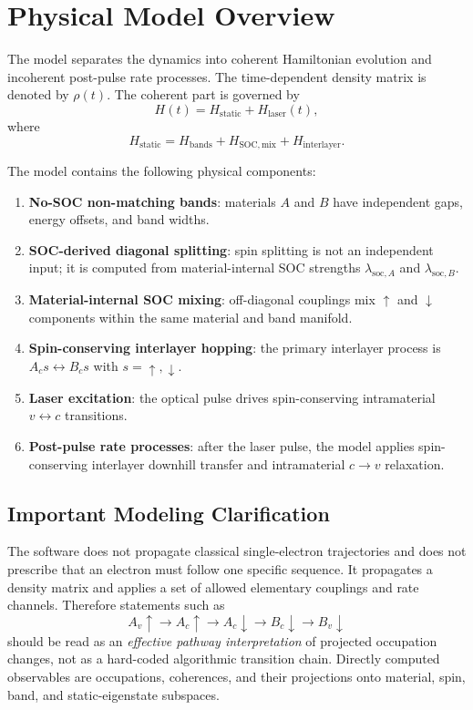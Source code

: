 \documentclass[11pt,a4paper]{article}
\begin{document}
\section{Physical Model Overview}

The model separates the dynamics into coherent Hamiltonian evolution and incoherent post-pulse rate processes.  The time-dependent density matrix is denoted by $\rho(t)$.  The coherent part is governed by
\begin{equation}
H(t) = H_{\mathrm{static}} + H_{\mathrm{laser}}(t),
\end{equation}
where
\begin{equation}
H_{\mathrm{static}}
=
H_{\mathrm{bands}}
+
H_{\mathrm{SOC,mix}}
+
H_{\mathrm{interlayer}}.
\end{equation}

The model contains the following physical components:
\begin{enumerate}[leftmargin=2em]
  \item \textbf{No-SOC non-matching bands}: materials $A$ and $B$ have independent gaps, energy offsets, and band widths.
  \item \textbf{SOC-derived diagonal splitting}: spin splitting is not an independent input; it is computed from material-internal SOC strengths $\lambda_{\mathrm{soc},A}$ and $\lambda_{\mathrm{soc},B}$.
  \item \textbf{Material-internal SOC mixing}: off-diagonal couplings mix $\uparrow$ and $\downarrow$ components within the same material and band manifold.
  \item \textbf{Spin-conserving interlayer hopping}: the primary interlayer process is $A_c s \leftrightarrow B_c s$ with $s=\uparrow,\downarrow$.
  \item \textbf{Laser excitation}: the optical pulse drives spin-conserving intramaterial $v\leftrightarrow c$ transitions.
  \item \textbf{Post-pulse rate processes}: after the laser pulse, the model applies spin-conserving interlayer downhill transfer and intramaterial $c\rightarrow v$ relaxation.
\end{enumerate}

\subsection*{Important Modeling Clarification}

The software does not propagate classical single-electron trajectories and does not prescribe that an electron must follow one specific sequence.  It propagates a density matrix and applies a set of allowed elementary couplings and rate channels.  Therefore statements such as
\begin{equation}
A_v\uparrow\rightarrow A_c\uparrow\rightarrow A_c\downarrow\rightarrow B_c\downarrow\rightarrow B_v\downarrow
\end{equation}
should be read as an \emph{effective pathway interpretation} of projected occupation changes, not as a hard-coded algorithmic transition chain.  Directly computed observables are occupations, coherences, and their projections onto material, spin, band, and static-eigenstate subspaces.
\end{document}
